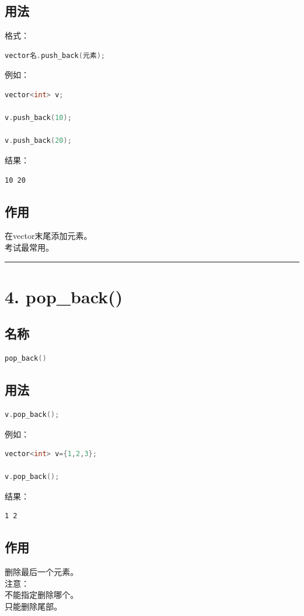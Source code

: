 \documentclass[10pt,twocolumn]{extarticle}
\begin{document}
\subsection{用法}
格式：
\begin{lstlisting}[language=C++]
vector名.push_back(元素);
\end{lstlisting}
例如：
\begin{lstlisting}[language=C++]
vector<int> v;

v.push_back(10);

v.push_back(20);
\end{lstlisting}
结果：
\begin{lstlisting}
10 20
\end{lstlisting}

\subsection{作用}
在vector末尾添加元素。\\
考试最常用。

\noindent\rule{\linewidth}{0.4pt}

\section{4. pop\_back()}

\subsection{名称}
\begin{lstlisting}[language=C++]
pop_back()
\end{lstlisting}

\subsection{用法}
\begin{lstlisting}[language=C++]
v.pop_back();
\end{lstlisting}
例如：
\begin{lstlisting}[language=C++]
vector<int> v={1,2,3};

v.pop_back();
\end{lstlisting}
结果：
\begin{lstlisting}
1 2
\end{lstlisting}

\subsection{作用}
删除最后一个元素。\\
注意：\\
不能指定删除哪个。\\
只能删除尾部。
\end{document}
